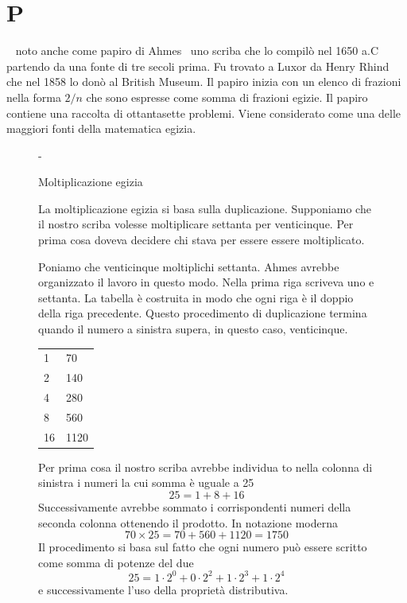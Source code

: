 \chapter{P}
\vspace{5mm}
\pointsto~ 
noto anche come papiro di Ahmes\pointsto~ uno scriba che lo  compilò nel 1650 a.C partendo da una fonte di tre secoli prima. Fu trovato a Luxor da Henry Rhind che nel 1858 lo donò al 
\foreignlanguage{english}{British Museum}. Il papiro inizia con un elenco di frazioni nella forma $2/n$ che sono espresse come somma di frazioni egizie. Il papiro  contiene una raccolta di ottantasette  problemi. Viene considerato come una delle maggiori fonti della matematica egizia. \cite{Gheverghese2000}
\begin{figure}[!htb]
\def\FrameCommand{\fboxsep=\FrameSep \colorbox{shadecolor}}%
\begin{MakeFramed}{\advance\hsize-\width \FrameRestore}%
\begin{center}%
\textcolor{StrongGray}{\textsf{Moltiplicazione egizia}}%
\par%
\vspace*{-\smallskipamount}%
\vrule height 0.8pt width 56mm%
\end{center}%
\begin{small}%
La moltiplicazione egizia si basa sulla duplicazione. Supponiamo che il nostro scriba volesse moltiplicare settanta per venticinque. Per prima  cosa doveva decidere chi stava per essere essere moltiplicato. 

Poniamo che venticinque moltiplichi settanta. Ahmes avrebbe organizzato il lavoro in questo modo. Nella prima riga scriveva uno e settanta. La tabella è costruita in modo che ogni riga è il doppio della riga precedente. Questo procedimento di duplicazione termina quando il numero a sinistra supera, in questo caso, venticinque.%
\begin{center}
\begin{tabular}{LL}
 & 70 \\ 
2 & 140 \\ 
4 & 280 \\ 
8 & 560 \\ 
16 & 1120 \\ 
\bottomrule
\end{tabular} 
\end{center}
Per prima cosa il nostro scriba avrebbe individua to nella colonna di sinistra i numeri la cui somma è uguale a 25 \[ 25=1+8+16\] Successivamente avrebbe sommato i corrispondenti numeri della seconda colonna ottenendo il prodotto. In notazione moderna\[ 70\times 25=70+560+1120=1750 \]Il procedimento si basa sul fatto che ogni numero può essere scritto come somma di potenze del  due \[25=1\cdot 2^0+0\cdot 2^2+1\cdot 2^3+1\cdot2^4  \] e successivamente l'uso della proprietà distributiva.
\end{small}%
\vspace*{-\smallskipamount}%
\end{MakeFramed}%
\end{figure}%

